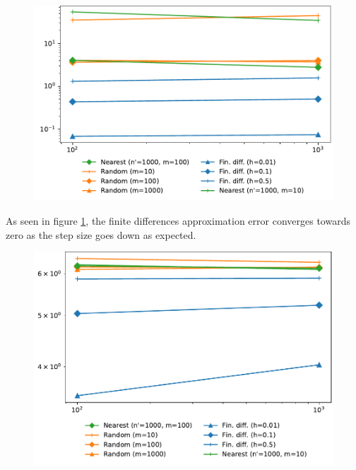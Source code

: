\documentclass[
  a4paper,  %
  twoside,  %
  bibliography=totoc,
  headsepline,
  cleardoublepage=empty,
  parskip=half,
  draft=false
]{scrbook}
\begin{document}
\begin{figure}[H]
\begin{center}
	\includegraphics[width=\textwidth]{graphics/as_grad_errors_f2}
\end{center}
	\label{fig:as_grad_errors_f2}
\end{figure}

As seen in figure \ref{fig:as_grad_errors_f2}, the finite differences approximation error converges towards zero as the step size goes down as expected.

\begin{figure}[H]
\begin{center}
	\includegraphics[width=\textwidth]{graphics/as_errors_f2}
\end{center}
	\label{fig:as_errors_f2}
\end{figure}
\end{document}
